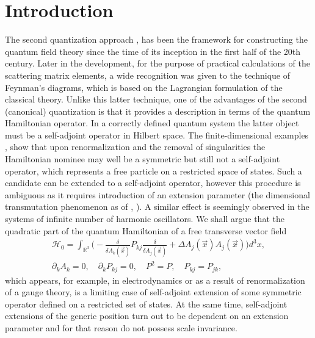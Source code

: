 \documentclass[12pt]{article}
\newcommand{\HH}{\mathscr{H}}
\newcommand{\RR}{\mathbb{R}}
\begin{document}
\section*{Introduction}
	The second quantization approach
\cite{Dirac}, \cite{Becchi}
	has been the framework for constructing the quantum field theory
	since the time of its inception in the first half of the 20th century.
	Later in the development, for the purpose of practical calculations
	of the scattering matrix elements, a wide recognition was given
	to the technique of Feynman's diagrams,
        which is based on the Lagrangian formulation of the classical theory.
	Unlike this latter technique, one of the advantages of the second
	(canonical) quantization is that it provides a description in terms
    of the quantum Hamiltonian operator.
	In a correctly defined quantum system the latter object must be
	a self-adjoint operator in Hilbert space.
	The finite-dimensional examples 
\cite{BF},
\cite{Jackiw}
	show that upon renormalization and the removal of singularities
	the Hamiltonian nominee may well be a symmetric but still not
	a self-adjoint operator, which represents
    a free particle on a restricted space of states.
	Such a candidate can be extended to a self-adjoint operator,
    however this procedure is ambiguous as it requires introduction
    of an extension parameter (the dimensional transmutation phenomenon as of
\cite{Jackiw},
\cite{LFres}).
    A similar effect is seemingly observed in the systems of infinite number
    of harmonic oscillators.
	We shall argue that the quadratic part of the quantum Hamiltonian of a free transverse vector field
\begin{gather*}
    \HH_{0} = \int_{\RR^{3}} \bigl(-\frac{\delta}{\delta A_{k}(\vec{x})}
	P_{kj} \frac{\delta}{\delta A_{j}(\vec{x})}
	+ \Delta A_{j}(\vec{x}) A_{j}(\vec{x}) \bigr)d^{3}x, \\
    \partial_{k} A_{k} = 0,\quad
    \partial_{k} P_{kj} =0, \quad P^{2}=P, \quad P_{kj} = P_{jk},
\end{gather*}
    which appears, for example, in electrodynamics or as a result of
    renormalization of a gauge theory, is a limiting case of self-adjoint
    extension of some symmetric operator defined on a restricted set
    of states.
    At the same time, self-adjoint extensions of the generic position
    turn out to be dependent on an extension parameter and for that
    reason do not possess scale invariance.
\end{document}
